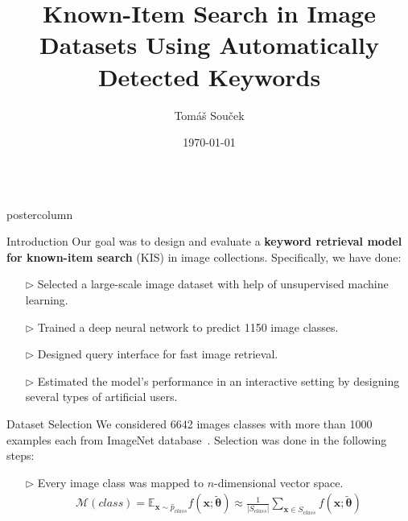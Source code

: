 \documentclass{beamer}
\title{\huge Known-Item Search in Image Datasets Using Automatically Detected Keywords}
\author{Tomáš Souček}
\institute{Faculty of Mathematics and Physics, Charles University}
\date{\today}
\newlength{\columnheight}
\begin{document}
	\begin{frame}
	\begin{columns}
		\begin{column}{.5\textwidth}
			\begin{beamercolorbox}[center]{postercolumn}
				\begin{minipage}{.98\textwidth}  %
					\parbox[t][\columnheight]{\textwidth}{ %
						\begin{myblock}{Introduction}
							Our goal was to design and evaluate a \textbf{keyword retrieval model for known-item search} (KIS) in image collections. Specifically, we have done:
							\par
							\vspace{1ex}
							\begin{minipage}{\textwidth-6ex-3ex}
								\raggedright
								\begin{itemize}
									\item[$\triangleright$] Selected a large-scale image dataset with help of unsupervised machine learning.
									\item[$\triangleright$] Trained a deep neural network to predict 1150 image classes.
									\item[$\triangleright$] Designed query interface for fast image retrieval.
									\item[$\triangleright$] Estimated the model’s performance in an interactive setting by designing several types of artificial users.
								\end{itemize}
							\end{minipage}
						\end{myblock}\vfill
						\begin{myblock}{Dataset Selection}
							We considered 6642 images classes with more than 1000 examples each from ImageNet database~\cite{ILSVRC15}. Selection was done in the following steps:
							\par
							\vspace{1ex}
							\begin{minipage}{\textwidth-6ex-3ex}
								\raggedright
								\begin{itemize}
									\item[$\triangleright$] Every image class was mapped to $n$-dimensional vector space.
									\begin{align*}
									\mathcal{M}(class)=\mathbb{E}_{\bm{x}\sim \hat{p}_{class}}f(\bm{x};\bm{\tilde{\theta}})\approx\frac{1}{|S_{class}|} \sum_{\bm{x}\in S_{class}} f(\bm{x};\bm{\tilde{\theta}})

\end{align*}
\end{itemize}
\end{minipage}
\end{myblock}}
\end{minipage}
\end{beamercolorbox}
\end{column}
\end{columns}
\end{frame}
\end{document}
